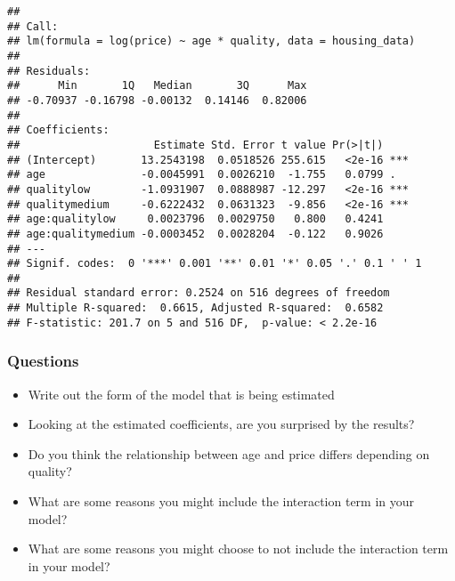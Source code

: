 \documentclass[
]{article}
\providecommand{\tightlist}{%
  \setlength{\itemsep}{0pt}\setlength{\parskip}{0pt}}
\begin{document}
\begin{verbatim}
## 
## Call:
## lm(formula = log(price) ~ age * quality, data = housing_data)
## 
## Residuals:
##      Min       1Q   Median       3Q      Max 
## -0.70937 -0.16798 -0.00132  0.14146  0.82006 
## 
## Coefficients:
##                     Estimate Std. Error t value Pr(>|t|)    
## (Intercept)       13.2543198  0.0518526 255.615   <2e-16 ***
## age               -0.0045991  0.0026210  -1.755   0.0799 .  
## qualitylow        -1.0931907  0.0888987 -12.297   <2e-16 ***
## qualitymedium     -0.6222432  0.0631323  -9.856   <2e-16 ***
## age:qualitylow     0.0023796  0.0029750   0.800   0.4241    
## age:qualitymedium -0.0003452  0.0028204  -0.122   0.9026    
## ---
## Signif. codes:  0 '***' 0.001 '**' 0.01 '*' 0.05 '.' 0.1 ' ' 1
## 
## Residual standard error: 0.2524 on 516 degrees of freedom
## Multiple R-squared:  0.6615, Adjusted R-squared:  0.6582 
## F-statistic: 201.7 on 5 and 516 DF,  p-value: < 2.2e-16
\end{verbatim}

\subsubsection{Questions}\label{questions-6}

\begin{itemize}
\tightlist
\item
  Write out the form of the model that is being estimated
\item
  Looking at the estimated coefficients, are you surprised by the
  results?
\item
  Do you think the relationship between age and price differs depending
  on quality?
\item
  What are some reasons you might include the interaction term in your
  model?
\item
  What are some reasons you might choose to not include the interaction
  term in your model?
\end{itemize}
\end{document}
